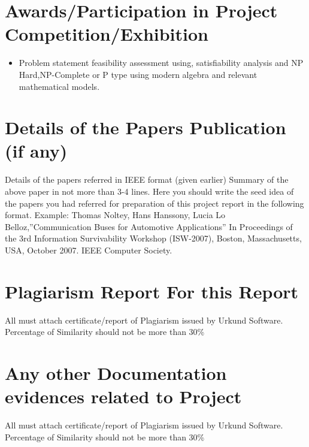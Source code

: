 \documentclass[oneside,a4paper,12pt]{report}
\begin{document}
\begin{appendices}
\chapter{Awards/Participation in Project Competition/Exhibition}
\begin{itemize}
\item Problem statement feasibility assessment using, satisfiability analysis and NP Hard,NP-Complete or P type using modern algebra and relevant mathematical models.\\ 
\end{itemize}

\chapter{Details of the Papers Publication (if any)}
Details of the papers referred in IEEE format (given earlier) Summary of the above paper in not more than 3-4 lines. Here you should write the seed idea of the papers you had referred for preparation of this project  report in the following format.
\newline
Example: 
Thomas Noltey, Hans Hanssony, Lucia Lo Belloz,”Communication Buses for Automotive Applications” In Proceedings of the 3rd Information Survivability Workshop (ISW-2007), Boston, Massachusetts, USA, October 2007. IEEE Computer Society.

\chapter{Plagiarism Report For this Report}
All must attach certificate/report of Plagiarism issued by Urkund Software. Percentage of Similarity should not be more than 30\%  

\chapter{Any other Documentation evidences related to Project}
All must attach certificate/report of Plagiarism issued by Urkund Software. Percentage of Similarity should not be more than 30\%  

\end{appendices}
\end{document}
